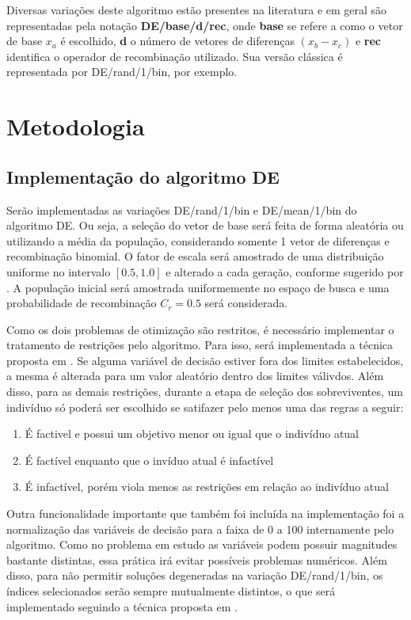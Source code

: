 \documentclass[conference]{IEEEtran}
\begin{document}
Diversas variações deste algoritmo estão presentes na literatura \cite{pant2020differential} e em geral são representadas pela notação \textbf{DE/base/d/rec}, onde \textbf{base} se refere a como o vetor de base $x_a$ é escolhido, \textbf{d} o número de vetores de diferenças $(x_b-x_c)$ e \textbf{rec} identifica o operador de recombinação utilizado. Sua versão clássica é representada por DE/rand/1/bin, por exemplo.


\section{Metodologia}

\subsection{Implementação do algoritmo DE}
Serão implementadas as variações DE/rand/1/bin e DE/mean/1/bin do algoritmo DE. Ou seja, a seleção do vetor de base será feita de forma aleatória ou utilizando a média da população, considerando somente 1 vetor de diferenças e recombinação binomial. O fator de escala será amostrado de uma distribuição uniforme no intervalo $[0.5,1.0]$ e alterado a cada geração, conforme sugerido por \cite{gaspar2012manual}. A população inicial será amostrada uniformemente no espaço de busca e uma probabilidade de recombinação $C_r = 0.5$ será considerada.

Como os dois problemas de otimização são restritos, é necessário implementar o tratamento de restrições pelo algoritmo. Para isso, será implementada a técnica proposta em \cite{lampinen2002constraint}. Se alguma variável de decisão estiver fora dos limites estabelecidos, a mesma é alterada para um valor aleatório dentro dos limites válivdos. Além disso, para as demais restrições, durante a etapa de seleção dos sobreviventes, um indivíduo só poderá ser escolhido se satifazer pelo menos uma das regras a seguir:
\begin{enumerate}
	\item É factivel e possui um objetivo menor ou igual que o indivíduo atual
	\item É factível enquanto que o invíduo atual é infactível
	\item É infactível, porém viola menos as restrições em relação ao indivíduo atual
\end{enumerate}

Outra funcionalidade importante que também foi incluída na implementação foi a normalização das variáveis de decisão para a faixa de 0 a 100 internamente pelo algoritmo. Como no problema em estudo as variáveis podem possuir magnitudes bastante distintas, essa prática irá evitar possíveis problemas numéricos. Além disso, para não permitir soluções degeneradas na variação DE/rand/1/bin, os índices selecionados serão sempre mutualmente distintos, o que será implementado seguindo a técnica proposta em \cite{gaspar2012manual}.
\end{document}
